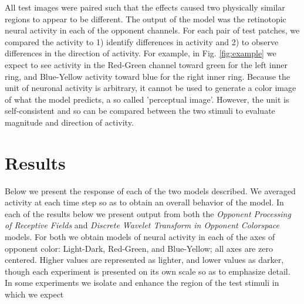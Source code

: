 \documentclass[journal,onecolumn]{IEEEtran}
\begin{document}
All test images were paired such that the effects caused two physically similar regions to appear to be different. The output of the model was the retinotopic neural activity in each of the opponent channels. For each pair of test patches, we compared the activity to 1) identify differences in activity and 2) to observe differences in the direction of activity. For example, in Fig. \ref{fig:example} we expect to see activity in the Red-Green channel toward green for the left inner ring, and Blue-Yellow activity toward blue for the right inner ring. Because the unit of neuronal activity is arbitrary, it cannot be used to generate a color image of what the model predicts, a so called 'perceptual image'. However, the unit is self-consistent and so can be compared between the two stimuli to evaluate magnitude and direction of activity.


%
%
%
\section{Results}

Below we present the response of each of the two models described. We averaged activity at each time step so as to obtain an overall behavior of the model. In each of the results below we present output from both the \textit{Opponent Processing of Receptive Fields} and \textit{Discrete Wavelet Transform in Opponent Colorspace} models. For both we obtain models of neural activity in each of the axes of opponent color: Light-Dark, Red-Green, and Blue-Yellow; all axes are zero centered. Higher values are represented as lighter, and lower values as darker, though each experiment is presented on its own scale so as to emphasize detail.
In some experiments we isolate and enhance the region of the test stimuli in which we expect 

\newpage
\end{document}
